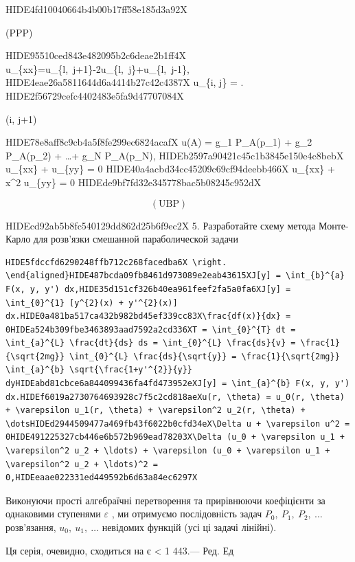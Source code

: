 \documentclass[
  ukrainian,
]{article}
\begin{document}
HIDE4fd10040664b4b00b17ff58e185d3a92X

(PPP)

HIDE95510ced843e482095b2c6deae2b1ff4X
u\_\{xx\}=u\_\{l,~j+1\}-2u\_\{l,~j\}+u\_\{l,~j-1\},
HIDE4eae26a5811644d6a4414b27c42c4387X u\_\{i, j\} =
.
HIDE2f56729cefc4402483e5fa9d47707084X

(i, j+1)

HIDE78e8aff8c9cb4a5f8fe299ec6824acafX u(A) = g\_1 P\_A(p\_1) + g\_2
P\_A(p\_2) + \dots + g\_N P\_A(p\_N),
HIDEb2597a90421c45c1b3845e150e4c8bebX u\_\{xx\} + u\_\{yy\} = 0
HIDE40a4acbd34cc45209c69cf94deebb466X u\_\{xx\} + x\^{}2 u\_\{yy\} = 0
HIDEde9bf7fd32e345778bac5b08245c952dX

\[
(\text{UBP}) \qquad
\]

HIDEcd92ab5b8fc540129dd862d25b6f9ec2X 5. Разработайте схему метода
Монте-Карло для розв'язки смешанной параболической задачи

\begin{verbatim}
HIDE5fdccfd6290248ffb712c268facedba6X \right. \end{aligned}HIDE487bcda09fb8461d973089e2eab43615XJ[y] = \int_{b}^{a} F(x, y, y') dx,HIDE35d151cf326b40ea961feef2fa5a0fa6XJ[y] = \int_{0}^{1} [y^{2}(x) + y'^{2}(x)] dx.HIDE0a481ba517ca432b982bd45ef339cc83X\frac{df(x)}{dx} = 0HIDEa524b309fbe3463893aad7592a2cd336XT = \int_{0}^{T} dt = \int_{a}^{L} \frac{dt}{ds} ds = \int_{0}^{L} \frac{ds}{v} = \frac{1}{\sqrt{2mg}} \int_{0}^{L} \frac{ds}{\sqrt{y}} = \frac{1}{\sqrt{2mg}} \int_{a}^{b} \sqrt{\frac{1+y'^{2}}{y}} dyHIDEabd81cbce6a844099436fa4fd473952eXJ[y] = \int_{a}^{b} F(x, y, y') dx.HIDEf6019a2730764693928c7f5c2cd818aeXu(r, \theta) = u_0(r, \theta) + \varepsilon u_1(r, \theta) + \varepsilon^2 u_2(r, \theta) + \dotsHIDEd2944509477a469fb43f6022b0cfd34eX\Delta u + \varepsilon u^2 = 0HIDE491225327cb446e6b572b969ead78203X\Delta (u_0 + \varepsilon u_1 + \varepsilon^2 u_2 + \ldots) + \varepsilon (u_0 + \varepsilon u_1 + \varepsilon^2 u_2 + \ldots)^2 = 0,HIDEeaae022331ed449592b6d63a84ec6297X
\end{verbatim}

Виконуючи прості алгебраїчні перетворення та прирівнюючи коефіцієнти за
однаковими ступенями \(\varepsilon\) , ми отримуємо послідовність задач
\(P_0,\ P_1,\ P_2,\ \dots\) розв'язання, \(u_0,\ u_1,\ \dots\) невідомих
функцій (усі ці задачі лінійні).

Ця серія, очевидно, сходиться на \textbar{} є \textbar{} \textless{} 1
443.--- Ред. Ед
\end{document}
